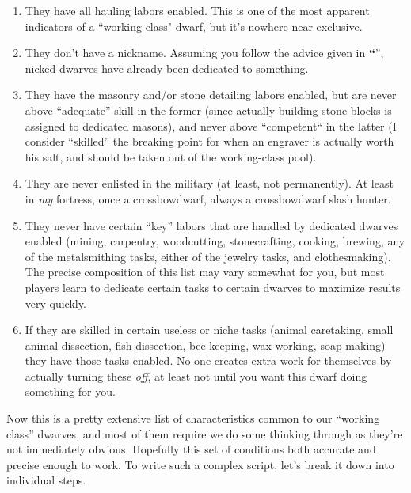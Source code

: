 \documentclass[]{article}
\newcommand{\jump}[1] {\textbf{``\nameref{sec:#1}}''}
\begin{document}
\begin{enumerate}
\item They have all hauling labors enabled. This is one of the most apparent indicators of a
``working-class" dwarf, but it's nowhere near exclusive.

\item They don't have a nickname. Assuming you follow the advice given in
\jump{Assigning Nicknames}, nicked dwarves have already been dedicated to something.

\item They have the masonry and/or stone detailing labors enabled, but are never above ``adequate'' skill
in the former (since actually building stone blocks is assigned to dedicated masons), and never above
``competent`` in the latter (I consider ``skilled'' the breaking point for when an engraver is actually worth
his salt, and should be taken out of the working-class pool).

\item They are never enlisted in the military (at least, not permanently). At least in \emph{my}
fortress, once a crossbowdwarf, always a crossbowdwarf slash hunter.

\item They never have certain ``key'' labors that are handled by dedicated dwarves enabled (mining,
carpentry, woodcutting, stonecrafting, cooking, brewing, any of the metalsmithing tasks, either of the
jewelry tasks, and clothesmaking). The precise composition of this list may vary somewhat for you, but
most players learn to dedicate certain tasks to certain dwarves to maximize results very quickly.

\item If they are skilled in certain useless or niche tasks (animal caretaking, small animal dissection,
fish dissection, bee keeping, wax working, soap making) they have those tasks enabled. No one creates
extra work for themselves by actually turning these \emph{off}, at least not until you want this dwarf
doing something for you.

\end{enumerate}

Now this is a pretty extensive list of characteristics common to our ``working class'' dwarves, and most
of them require we do some thinking through as they're not immediately obvious.
Hopefully this set of conditions both accurate and precise enough to work. To write such a complex
script, let's break it down into individual steps.
\vspace{12pt}
\end{document}
